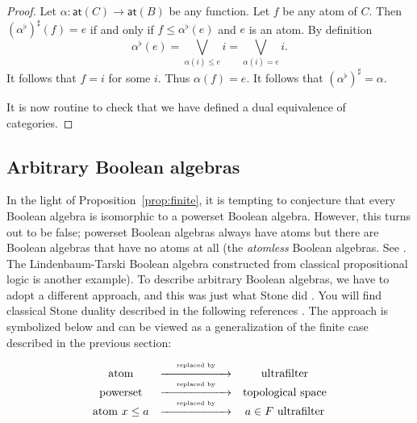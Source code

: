 \documentclass[a4paper]{amsart}
\begin{document}
\begin{proof}
Let $\alpha \colon \mathsf{at}(C) \rightarrow \mathsf{at}(B)$ be any function.
Let $f$ be any atom of $C$.
Then $(\alpha^{\flat})^{\sharp}(f) = e$ if and only if $f \leq \alpha^{\flat} (e)$ and $e$ is an atom.
By definition $$\alpha^{\flat}(e) = \bigvee_{\alpha (i) \leq e} i = \bigvee_{\alpha (i) = e}i.$$
It follows that $f = i$ for some $i$.
Thus $\alpha (f) = e$.
It follows that $(\alpha^{\flat})^{\sharp} = \alpha$.

It is now routine to check that we have defined a dual equivalence of categories.
\end{proof}



\subsection{Arbitrary Boolean algebras}


In the light of Proposition~\ref{prop:finite},
it is tempting to conjecture that every Boolean algebra is isomorphic to a powerset Boolean algebra.
However, this turns out to be false;
powerset Boolean algebras always have atoms but there are Boolean algebras
that have no atoms at all 
(the {\em atomless} Boolean algebras. See \cite[page 118, Chapter 4]{GH}. The Lindenbaum-Tarski Boolean algebra constructed from classical propositional logic is another example).
To describe arbitrary Boolean algebras, we have to adopt a different approach, and this was just what Stone did \cite{Stone1937}.
You will find classical Stone duality described in the following references \cite{BS, GH, Johnstone, Koppelberg}.
The approach is symbolized below and can be viewed as a generalization of the finite case described in the previous section:

$$
\begin{array}{ccc}
\text{atom} & \stackrel{\text{\tiny replaced by}}{\xrightarrow{\hspace*{2cm}}} & \text{ultrafilter} \\
\text{powerset} & \stackrel{\text{\tiny replaced by}}{ \xrightarrow{\hspace*{2cm}}} & \text{topological space}\\
\text{atom }x \leq a        &\stackrel{\text{\tiny replaced by}}{\xrightarrow{\hspace*{2cm}}} & a \in F \text{ ultrafilter}\\
\end{array}
$$
\end{document}
